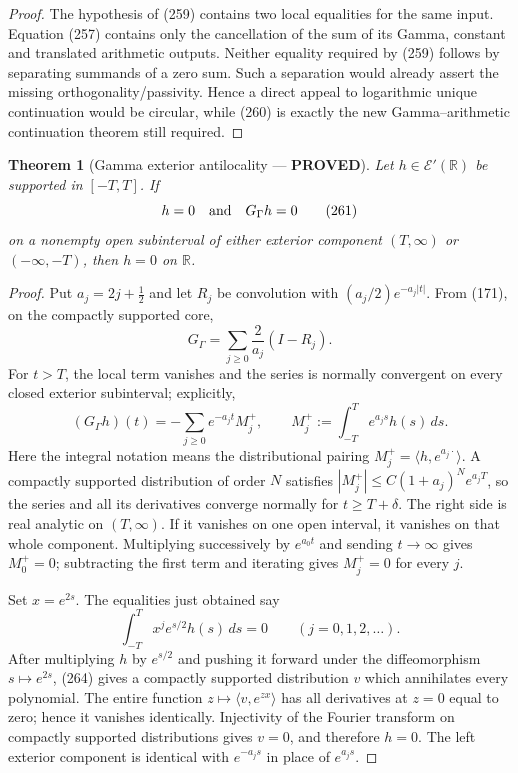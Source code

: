 \documentclass[11pt]{article}
\newtheorem{theorem}{Theorem}
\newcommand{\PROVED}{\textcolor{green!45!black}{\textbf{PROVED}}}
\begin{document}
\begin{proof}
The hypothesis of (259) contains two local equalities for the same input.
Equation (257) contains only the cancellation of the sum of its Gamma,
constant and translated arithmetic outputs.  Neither equality required by
(259) follows by separating summands of a zero sum.  Such a separation would
already assert the missing orthogonality/passivity.  Hence a direct appeal to
logarithmic unique continuation would be circular, while (260) is exactly
the new Gamma--arithmetic continuation theorem still required.
\end{proof}

\begin{theorem}[Gamma exterior antilocality --- \PROVED]
Let $h\in\mathcal E'(\mathbb R)$ be supported in $[-T,T]$.  If
\begin{equation}
 h=0\quad\hbox{and}\quad G_\Gamma h=0                \tag{261}
\end{equation}
on a nonempty open subinterval of either exterior component
$(T,\infty)$ or $(-\infty,-T)$, then $h=0$ on $\mathbb R$.
\end{theorem}

\begin{proof}
Put $a_j=2j+\tfrac12$ and let $R_j$ be convolution with
$(a_j/2)e^{-a_j|t|}$.  From (171), on the compactly supported core,
\begin{equation}
 G_\Gamma=\sum_{j\ge0}\frac2{a_j}(I-R_j).            \tag{262}
\end{equation}
For $t>T$, the local term vanishes and the series is normally convergent on
every closed exterior subinterval; explicitly,
\begin{equation}
 (G_\Gamma h)(t)
 =-\sum_{j\ge0}e^{-a_jt}M_j^+,
 \qquad
 M_j^+:=\int_{-T}^{T}e^{a_js}h(s)\,ds.               \tag{263}
\end{equation}
Here the integral notation means the distributional pairing
$M_j^+=\langle h,e^{a_j\cdot}\rangle$.  A compactly supported distribution
of order $N$ satisfies $|M_j^+|\le C(1+a_j)^Ne^{a_jT}$, so the series and all
its derivatives converge normally for $t\ge T+\delta$.  The right side is real analytic on
$(T,\infty)$.  If it vanishes on one open interval, it vanishes on that
whole component.  Multiplying successively by $e^{a_0t}$ and sending
$t\to\infty$ gives $M_0^+=0$; subtracting the first term and iterating gives
$M_j^+=0$ for every $j$.

Set $x=e^{2s}$.  The equalities just obtained say
\begin{equation}
 \int_{-T}^{T}x^j e^{s/2}h(s)\,ds=0
 \qquad(j=0,1,2,\ldots).                              \tag{264}
\end{equation}
After multiplying $h$ by $e^{s/2}$ and pushing it forward under the
diffeomorphism $s\mapsto e^{2s}$, (264) gives a compactly supported
distribution $v$ which annihilates every polynomial.  The entire function
$z\mapsto\langle v,e^{zx}\rangle$ has all derivatives at $z=0$ equal to
zero; hence it vanishes identically.  Injectivity of the Fourier transform
on compactly supported distributions gives $v=0$, and therefore $h=0$.
The left exterior component is identical with $e^{-a_js}$ in place of
$e^{a_js}$.
\end{proof}
\end{document}
